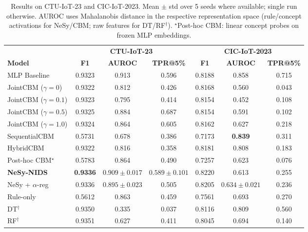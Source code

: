 \documentclass[conference]{IEEEtran}
\begin{document}
\begin{table}[!t]
\renewcommand{\arraystretch}{1.15}
\caption{Results on CTU-IoT-23 and CIC-IoT-2023. Mean $\pm$ std over 5
  seeds where available; single run otherwise. AUROC uses Mahalanobis
  distance in the respective representation space (rule/concept
  activations for NeSy/CBM; raw features for DT/RF$^\dagger$).
  $^\star$Post-hoc CBM: linear concept probes on frozen MLP embeddings.}
\label{tab:main}
\centering
\small
\begin{tabular}{lcccccc}
\toprule
& \multicolumn{3}{c}{\textbf{CTU-IoT-23}} &
  \multicolumn{3}{c}{\textbf{CIC-IoT-2023}} \\
\cmidrule(lr){2-4}\cmidrule(lr){5-7}
\textbf{Model} & \textbf{F1} & \textbf{AUROC} & \textbf{TPR@5\%} &
                 \textbf{F1} & \textbf{AUROC} & \textbf{TPR@5\%} \\
\midrule
MLP Baseline
  & 0.9323 & 0.913 & 0.596
  & 0.8188 & 0.858 & 0.715 \\
\midrule
JointCBM ($\gamma{=}0$)
  & 0.9322 & 0.812 & 0.426
  & 0.8168 & 0.560 & 0.043 \\
JointCBM ($\gamma{=}0.1$)
  & 0.9323 & 0.795 & 0.414
  & 0.8154 & 0.452 & 0.108 \\
JointCBM ($\gamma{=}0.5$)
  & 0.9325 & 0.884 & 0.687
  & 0.8154 & 0.591 & 0.102 \\
JointCBM ($\gamma{=}1.0$)
  & 0.9324 & 0.864 & 0.605
  & 0.8162 & 0.627 & 0.218 \\
SequentialCBM
  & 0.5731 & 0.678 & 0.386
  & 0.7173 & \textbf{0.839} & 0.311 \\
HybridCBM
  & 0.9322 & 0.816 & 0.358
  & 0.8181 & 0.808 & 0.183 \\
Post-hoc CBM$^\star$
  & 0.5783 & 0.864 & 0.490
  & 0.7257 & 0.623 & 0.076 \\
\midrule
\textbf{NeSy-NIDS}
  & \textbf{0.9336} & $\mathbf{0.909\pm0.017}$ & $0.589\pm0.101$
  & $\mathbf{0.8220}$ & 0.613 & 0.255 \\
NeSy + $\alpha$-reg
  & 0.9336 & $0.895\pm0.023$ & 0.505
  & 0.8205 & $0.634\pm0.021$ & 0.236 \\
Rule-only
  & 0.5612 & 0.863 & 0.459
  & 0.7561 & 0.693 & 0.270 \\
\midrule
DT$^\dagger$
  & 0.9350 & 0.335 & 0.037
  & 0.8116 & 0.809 & 0.560 \\
RF$^\dagger$
  & 0.9351 & 0.627 & 0.411
  & 0.8045 & 0.694 & 0.140 \\
\bottomrule
\end{tabular}
\end{table}
\end{document}
